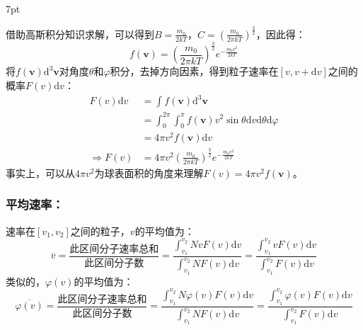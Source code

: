 \documentclass[zihao=-4,UTF8]{report}
\newenvironment{graybox}{%
\def\FrameCommand{%
\hspace{1pt}%
{\color{gray}\small \vrule width 2pt}%
{\color{graybox_color}\vrule width 4pt}%
\colorbox{graybox_color}%
}%
\MakeFramed{\advance\hsize-\width\FrameRestore}%
\noindent\hspace{-4.55pt}%
\begin{adjustwidth}{}{7pt}%
\vspace{2pt}\vspace{2pt}%
}
{%
\vspace{2pt}\end{adjustwidth}\endMakeFramed%
}
\begin{document}
\begin{graybox}
    借助高斯积分知识求解，可以得到$B = \frac{m_0}{2kT}$，$C = \left(\frac{m_0}{2\pi kT}\right)^{\frac{3}{2}}$，因此得：
    \begin{equation}
        f(\boldsymbol{v}) = \left(\frac{m_0}{2\pi kT}\right)^{\frac{3}{2}}e^{-\frac{m_0v^2}{2kT}}
    \end{equation}
    将$f(\boldsymbol{v})\mathrm{d}^3\boldsymbol{v}$对角度$\theta$和$\varphi$积分，去掉方向因素，得到粒子速率在$[v,v+\mathrm{d}v]$之间的概率$F(v)\mathrm{d }v$：
    \begin{align*}
        F(v)\mathrm{d}v &= \int f(\boldsymbol{v})\mathrm{d}^3\boldsymbol{v} \\
        &= \int_{0}^{2\pi } \int_{0}^{\pi }  f(\boldsymbol{v})v^2\sin \theta  \mathrm{d}v\mathrm{d}\theta\mathrm{d}\varphi\\
        & = 4\pi v^2 f(\boldsymbol{v})\mathrm{d}v \\
        \Longrightarrow  F(v) & = 4\pi v^2\left(\frac{m_0}{2\pi kT}\right)^{\frac{3}{2}}e^{-\frac{m_0v^2}{2kT}}
    \end{align*}
事实上，可以从$4\pi v^2$为球表面积的角度来理解$F(v) = 4\pi v^2 f(\boldsymbol{v})$。
\end{graybox}  
\subsubsection{平均速率：}
速率在$[v_1,v_2]$之间的粒子，$v$的平均值为：
\begin{equation}
    \overline{v} = \frac{\text{此区间分子速率总和}}{\text{此区间分子数}} = \frac{\int_{v_1}^{v_2}NvF(v)\mathrm{d}v }{\int_{v_1}^{v_2}NF(v)\mathrm{d}v} = \frac{\int_{v_1}^{v_2}vF(v)\mathrm{d}v }{\int_{v_1}^{v_2}F(v)\mathrm{d}v}
\end{equation}
类似的，$\varphi(v)$的平均值为：
\begin{equation}
    \overline{\varphi(v)} = \frac{\text{此区间分子速率总和}}{\text{此区间分子数}} = \frac{\int_{v_1}^{v_2}N\varphi(v)F(v)\mathrm{d}v }{\int_{v_1}^{v_2}NF(v)\mathrm{d}v} = \frac{\int_{v_1}^{v_2}\varphi(v)F(v)\mathrm{d}v }{\int_{v_1}^{v_2}F(v)\mathrm{d}v}
\end{equation}
\end{document}
